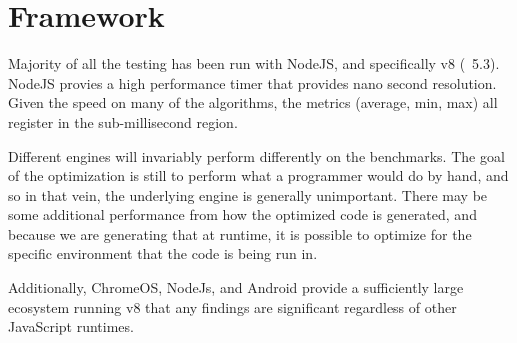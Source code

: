 \section{Framework}

Majority of all the testing has been run with NodeJS, and specifically v8 (~5.3).  NodeJS provies a high performance timer that provides nano second resolution.  Given the speed on many of the algorithms, the metrics (average, min, max) all register in the sub-millisecond region.  

Different engines will invariably perform differently on the benchmarks.  The goal of the optimization is still to perform what a programmer would do by hand, and so in that vein, the underlying engine is generally unimportant.  There may be some additional performance from how the optimized code is generated, and because we are generating that at runtime, it is possible to optimize for the specific environment that the code is being run in.  

Additionally, ChromeOS, NodeJs, and Android provide a sufficiently large ecosystem running v8 that any findings are significant regardless of other JavaScript runtimes.


